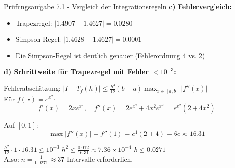 \begin{example2}{Prüfungsaufgabe 7.1 - Vergleich der Integrationsregeln}
\textbf{c) Fehlervergleich:}
\begin{itemize}
    \item Trapezregel: $|1.4907 - 1.4627| = 0.0280$
    \item Simpson-Regel: $|1.4628 - 1.4627| = 0.0001$
    \item Die Simpson-Regel ist deutlich genauer (Fehlerordnung 4 vs. 2)
\end{itemize}
\vspace{2mm}
\textbf{d) Schrittweite für Trapezregel mit Fehler $< 10^{-3}$:}

Fehlerabschätzung: $|I - T_f(h)| \leq \frac{h^2}{12}(b-a) \max_{x \in [a,b]} |f''(x)|$
\vspace{2mm}\\
Für $f(x) = e^{x^2}$:
$$f'(x) = 2xe^{x^2}, \quad
f''(x) = 2e^{x^2} + 4x^2e^{x^2} = e^{x^2}(2 + 4x^2)$$

Auf $[0,1]$: $$\max |f''(x)| = f''(1) = e^1(2 + 4) = 6e \approx 16.31$$

$\frac{h^2}{12} \cdot 1 \cdot 16.31 \leq 10^{-3}$
$h^2 \leq \frac{0.012}{16.31} \approx 7.36 \times 10^{-4}$
$h \leq 0.0271$
\vspace{2mm}\\
Also: $n = \frac{1}{0.0271} \approx 37$ Intervalle erforderlich.
\end{example2}

